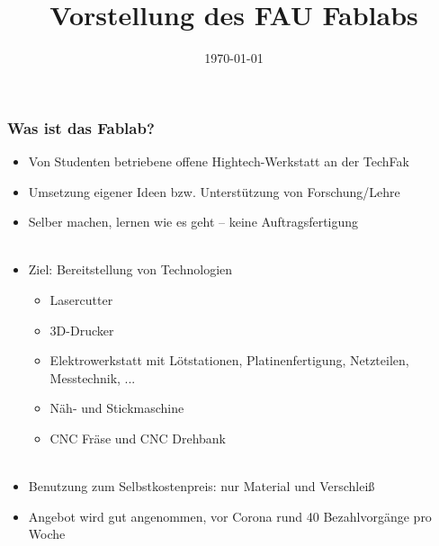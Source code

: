 \documentclass[t]{beamer}
\begin{document}


\date{\today}
\title[Vorstellung]{Vorstellung des FAU Fablabs}
\author{} %
\frame[plain,c]{\titlepage} %




\begin{frame}
    \frametitle{Was ist das Fablab?}
    \begin{itemize}
        \item Von Studenten betriebene offene Hightech-Werkstatt an der TechFak
        \item Umsetzung eigener Ideen bzw. Unterstützung von Forschung/Lehre
        \item Selber machen, lernen wie es geht -- keine Auftragsfertigung\\~
		\item Ziel: Bereitstellung von Technologien 
			\begin{itemize}
				\item Lasercutter
				\item 3D-Drucker
				\item Elektrowerkstatt mit Lötstationen, Platinenfertigung, Netzteilen, Messtechnik, ...
				\item Näh- und Stickmaschine
				\item CNC Fräse und CNC Drehbank\\~
			\end{itemize}
        \item Benutzung zum Selbstkostenpreis: nur Material und Verschleiß
		\item Angebot wird gut angenommen, vor Corona rund 40 Bezahlvorgänge pro Woche
    \end{itemize}

\end{frame}
\end{document}
